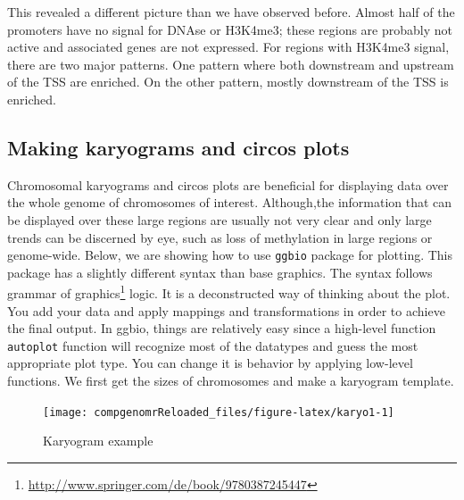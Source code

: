 \documentclass[12pt,]{krantz}
\newenvironment{Shaded}{\begin{snugshade}}{\end{snugshade}}
\newcommand{\DataTypeTok}[1]{\textcolor[rgb]{0.13,0.29,0.53}{#1}}
\newcommand{\KeywordTok}[1]{\textcolor[rgb]{0.13,0.29,0.53}{\textbf{#1}}}
\newcommand{\NormalTok}[1]{#1}
\newcommand{\OperatorTok}[1]{\textcolor[rgb]{0.81,0.36,0.00}{\textbf{#1}}}
\newcommand{\StringTok}[1]{\textcolor[rgb]{0.31,0.60,0.02}{#1}}
\renewcommand{\href}[2]{#2\footnote{\url{#1}}}
\begin{document}
This revealed a different picture than we have observed before. Almost half of the promoters have no signal for DNAse or H3K4me3; these regions are probably not active and associated genes are not expressed. For regions with H3K4me3 signal, there are two major patterns. One pattern where both downstream and upstream of the TSS are enriched. On the other pattern, mostly downstream of the TSS is enriched.

\hypertarget{making-karyograms-and-circos-plots}{%
\subsection{Making karyograms and circos plots}\label{making-karyograms-and-circos-plots}}

Chromosomal karyograms and circos plots are beneficial for displaying data over the
whole genome of chromosomes of interest. Although,the information that can be
displayed over these large regions are usually not very clear and only large trends
can be discerned by eye, such as loss of methylation in large regions or genome-wide.
Below, we are showing how to use \texttt{ggbio} package for plotting.
This package has a slightly different syntax than base graphics. The syntax follows
\href{http://www.springer.com/de/book/9780387245447}{grammar of graphics} logic. It is
a deconstructed way of thinking about the plot. You add your data and apply mappings
and transformations in order to achieve the final output. In ggbio, things are
relatively easy since a high-level function \texttt{autoplot} function will recognize
most of the datatypes and guess the most appropriate plot type. You can change
it is behavior by applying low-level functions. We first get the sizes of chromosomes
and make a karyogram template.

\begin{Shaded}
\end{Shaded}

\begin{figure}

{\centering \texttt{[image: compgenomrReloaded\_files/figure-latex/karyo1-1]} 

}

\caption{Karyogram example}\label{fig:karyo1}
\end{figure}
\end{document}
